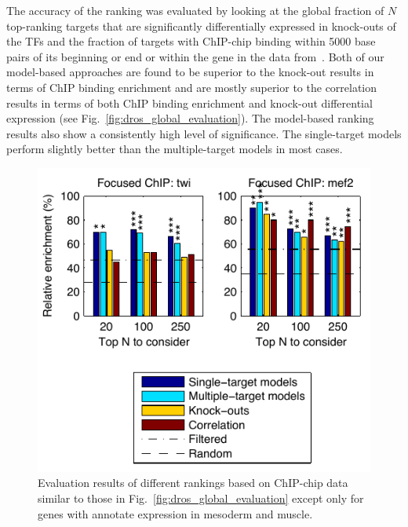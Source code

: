 \documentclass{pnastwo}
\begin{document}
\begin{article}
The accuracy of the ranking was evaluated by looking at the global
fraction of $N$ top-ranking targets that are significantly
differentially expressed in knock-outs of the TFs and the fraction
of targets with ChIP-chip binding within 5000 base
pairs of its beginning or end or within the gene in the data
from~\cite{Zinzen2009}. Both of our model-based approaches are found to
be superior to the knock-out results in terms of ChIP binding
enrichment and are mostly superior to the correlation results in terms
of both ChIP binding enrichment and knock-out differential expression
(see Fig.~\ref{fig:dros_global_evaluation}). The model-based ranking
results also show a consistently high level of significance. The
single-target models perform slightly better than the multiple-target
models in most cases.

\begin{figure}[tb]
  \centering
  \includegraphics{dros_focused_evaluation}
  \caption{Evaluation results of different rankings based on
    ChIP-chip data similar to those in
    Fig.~\ref{fig:dros_global_evaluation} except only for genes
    with annotate expression in mesoderm and muscle.
\label{fig:dros_focused_evaluation}
}
\end{figure}


\end{article}
\end{document}
